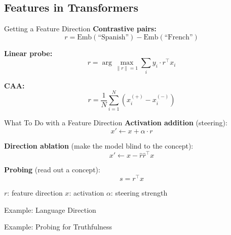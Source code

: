 \subsection{Features in Transformers}


\begin{frame}{Getting a Feature Direction}
\textbf{Contrastive pairs:}
\[ r = \text{Emb}(\text{``Spanish''}) - \text{Emb}(\text{``French''}) \]

\vspace{0.5em}
\textbf{Linear probe:} 
\[ r = \arg\max_{\|r\|=1} \sum_i y_i \cdot r^\top x_i \]

\vspace{0.5em}
\textbf{CAA:} 
\[ r = \frac{1}{N} \sum_{i=1}^{N} \left( x_i^{(+)} - x_i^{(-)} \right) \]
\end{frame}

\begin{frame}{What To Do with a Feature Direction}
\textbf{Activation addition} (steering):
\[ x' \leftarrow x + \alpha \cdot r \]

\vspace{0.5em}
\textbf{Direction ablation} (make the model blind to the concept):
\[ x' \leftarrow x - \hat{r}\hat{r}^\top x \]

\vspace{0.5em}
\textbf{Probing} (read out a concept):
\[ s = r^\top x \]

\vspace{0.3em}
{\small $r$: feature direction \quad $x$: activation \quad $\alpha$: steering strength}

\end{frame}

\begin{frame}{Example: Language Direction}

\end{frame}

\begin{frame}{Example: Probing for Truthfulness}

\end{frame}

